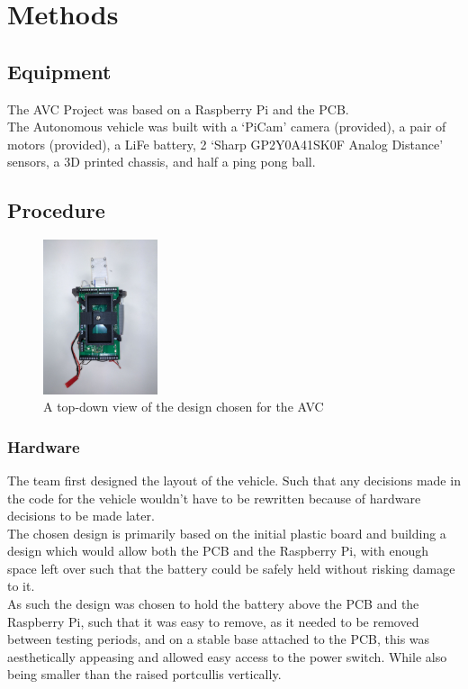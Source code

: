 \documentclass[paper=a4, fontsize=11pt]{scrartcl} %
\numberwithin{equation}{section} %
\numberwithin{figure}{section} %
\begin{document}
\section{Methods}
\subsection{Equipment}
The AVC Project was based on a Raspberry Pi and the PCB.\\
The Autonomous vehicle was built with a `PiCam' camera (provided), a pair of
motors (provided), a LiFe battery, 2 `Sharp GP2Y0A41SK0F Analog Distance'
sensors, a 3D printed chassis, and half a ping pong ball.
\subsection{Procedure}
\begin{figure}
\begin{center}
\includegraphics[width=0.3\textwidth]{top-down-view}
\caption{A top-down view of the design chosen for the AVC}
\end{center}
\end{figure}
\subsubsection{Hardware}
The team first designed the layout of the vehicle. Such that any decisions made
in the code for the vehicle wouldn't have to be rewritten because of hardware
decisions to be made later.\\

The chosen design is primarily based on the initial plastic board and building a
design which would allow both the PCB and the Raspberry Pi, with enough space
left over such that the battery could be safely held without risking damage to
it.\\

As such the design was chosen to hold the battery above the PCB and the
Raspberry Pi, such that it was easy to remove, as it needed to be removed
between testing periods, and on a stable base attached to the PCB, this was
aesthetically appeasing and allowed easy access to the power switch. While also
being smaller than the raised portcullis vertically.\\
\end{document}
